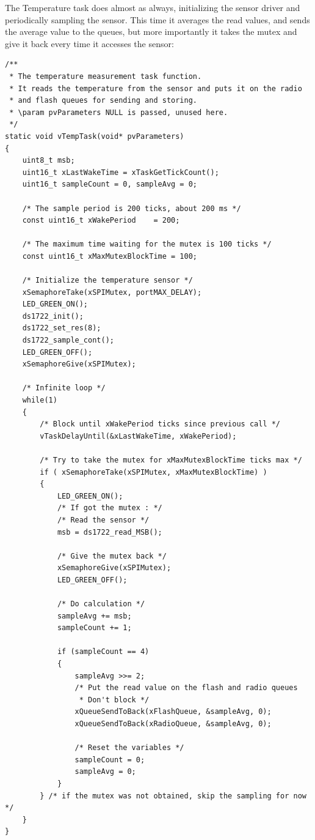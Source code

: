 \documentclass[11pt]{report}
\begin{document}
The Temperature task does almost as always, initializing the sensor driver and periodically sampling the sensor. This time it averages the read values, and sends the average value to the queues, but more importantly it takes the mutex and give it back every time it accesses the sensor:

\begin{verbatim}
/**
 * The temperature measurement task function.
 * It reads the temperature from the sensor and puts it on the radio
 * and flash queues for sending and storing.
 * \param pvParameters NULL is passed, unused here.
 */
static void vTempTask(void* pvParameters)
{
    uint8_t msb;
    uint16_t xLastWakeTime = xTaskGetTickCount();
    uint16_t sampleCount = 0, sampleAvg = 0;

    /* The sample period is 200 ticks, about 200 ms */
    const uint16_t xWakePeriod    = 200;

    /* The maximum time waiting for the mutex is 100 ticks */
    const uint16_t xMaxMutexBlockTime = 100;

    /* Initialize the temperature sensor */
    xSemaphoreTake(xSPIMutex, portMAX_DELAY);
    LED_GREEN_ON();
    ds1722_init();
    ds1722_set_res(8);
    ds1722_sample_cont();
    LED_GREEN_OFF();
    xSemaphoreGive(xSPIMutex);

    /* Infinite loop */
    while(1)
    {
        /* Block until xWakePeriod ticks since previous call */
        vTaskDelayUntil(&xLastWakeTime, xWakePeriod);

        /* Try to take the mutex for xMaxMutexBlockTime ticks max */
        if ( xSemaphoreTake(xSPIMutex, xMaxMutexBlockTime) )
        {
            LED_GREEN_ON();
            /* If got the mutex : */
            /* Read the sensor */
            msb = ds1722_read_MSB();

            /* Give the mutex back */
            xSemaphoreGive(xSPIMutex);
            LED_GREEN_OFF();

            /* Do calculation */
            sampleAvg += msb;
            sampleCount += 1;

            if (sampleCount == 4)
            {
                sampleAvg >>= 2;
                /* Put the read value on the flash and radio queues
                 * Don't block */
                xQueueSendToBack(xFlashQueue, &sampleAvg, 0);
                xQueueSendToBack(xRadioQueue, &sampleAvg, 0);

                /* Reset the variables */
                sampleCount = 0;
                sampleAvg = 0;
            }
        } /* if the mutex was not obtained, skip the sampling for now */
    }
}
\end{verbatim}
\end{document}
